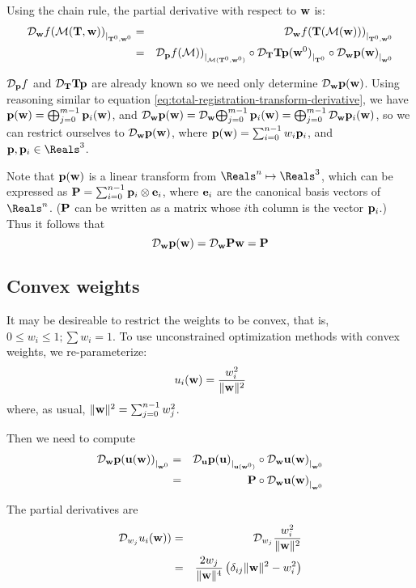 Using the chain rule, the partial derivative with respect to $\w$ is:
\begin{eqnarray}
\De{\w}{f(\M(\Tr,\w))}{\Tr^0,\w^0}
& = &
\De{\w}{f(\Tr(\M(\w)))}{\Tr^0,\w^0}
\\
& = &
\De{\p}{f(\M))}{\M(\Tr^0,\w^0)}
\circ
\De{\Tr}{\Tr\p(\w^0)}{\Tr^0}
\circ
\De{\w}{\p(\w)}{\w^0}
\nonumber
\end{eqnarray}

$\Df{\p}{f}$ and $\Df{\Tr}{\Tr\p}$ are already known
so we need only determine $\Df{\w}{\p(\w)}$.
Using reasoning similar
to equation \ref{eq:total-registration-transform-derivative},
we have $\p(\w) = \bigoplus_{j=0}^{m-1} \p_i(\w)$,
and
$\Df{\w}{\p(\w)}
=
\Df{\w}{\bigoplus_{j=0}^{m-1} \p_i(\w)}
=
\bigoplus_{j=0}^{m-1} \Df{\w}{\p_i(\w)}$,
so we can restrict ourselves to
$\Df{\w}{\p(\w)}$, where $\p(\w) = \sum_{i=0}^{n-1} w_i \p_i$,
and $\p, \p_i \in \Reals^3$.

Note that $\p(\w)$ is a linear transform from $\Reals^n \mapsto \Reals^3$,
which can be expressed as $\P = \sum_{i=0}^{n-1} \p_i \otimes \e_i$,
where $\e_i$ are the canonical basis vectors of $\Reals^n$.
($\P$ can be written as a matrix whose $i$th column is the vector $\p_i$.)
Thus it follows that
\begin{equation}
\Df{\w}{\p(\w)} = \Df{\w}{\P\w} = \P
\end{equation}

\subsection{Convex weights}
\label{sec:Convex-weights}

It may be desireable to restrict the weights to be convex,
that is, $0 \leq w_i \leq 1; \sum w_i = 1$.
To use unconstrained optimization methods with convex weights,
we re-parameterize:
\begin{equation}
u_i(\w) = {{w_i^2} \over {\| \w \|^2}}
\end{equation}
where, as usual, $\| \w \|^2 = \sum_{j=0}^{n-1} w_j^2$.

Then we need to compute
\begin{eqnarray}
\De{\w}{\p(\u(\w))}{\w^0}
& = &
\De{\u}{\p(\u)}{\u(\w^0)}
\circ
\De{\w}{\u(\w)}{\w^0}
\\
& = &
\P
\circ
\De{\w}{\u(\w)}{\w^0}
\nonumber
\end{eqnarray}

The partial derivatives are
\begin{eqnarray}
\Df{w_j}{u_i(\w))}
& = &
\Df{w_j}{{w_i^2} \over {\| \w \|^2}}
\\
& = &
{{2 w_j} \over {\| \w \|^4}} \left( \delta_{ij} \| \w \|^2 - w_i^2 \right)
\nonumber
\end{eqnarray}
